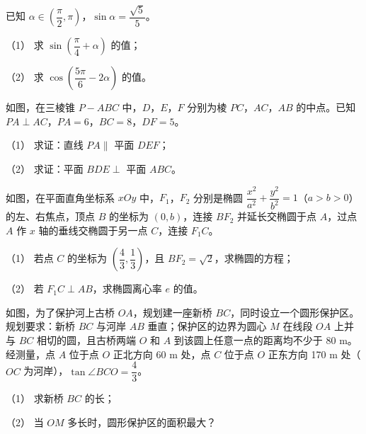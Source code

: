 \begin{question}
已知 $\alpha\in\left(\dfrac\pi2,\pi\right)$，$\sin\alpha=\dfrac{\sqrt5}{5}$。

（1） 求 $\sin\left(\dfrac\pi4+\alpha\right)$ 的值；

（2） 求 $\cos\left(\dfrac{5\pi}6-2\alpha\right)$ 的值。

\Needspace{0.4\textheight}
\end{question}
\begin{question}
如图，在三棱锥 $P-ABC$ 中，$D$，$E$，$F$ 分别为棱 $PC$，$AC$，$AB$ 的中点。已知 $PA\perp AC$，$PA=6$，$BC=8$，$DF=5$。

（1） 求证：直线 $PA\parallel$ 平面 $DEF$；

（2） 求证：平面 $BDE\perp$ 平面 $ABC$。
\nopagebreak[4]
\begin{center}\end{center}
\nopagebreak[4]
\Needspace{0.4\textheight}
\end{question}
\begin{question}
如图，在平面直角坐标系 $xOy$ 中，$F_1$，$F_2$ 分别是椭圆 $\dfrac{x^2}{a^2}+\dfrac{y^2}{b^2}=1$（$a>b>0$）的左、右焦点，顶点 $B$ 的坐标为 $(0,b)$，连接 $BF_2$ 并延长交椭圆于点 $A$，过点 $A$ 作 $x$ 轴的垂线交椭圆于另一点 $C$，连接 $F_1C$。

（1） 若点 $C$ 的坐标为 $\left(\dfrac43,\dfrac13\right)$，且 $BF_2=\sqrt2$，求椭圆的方程；

（2） 若 $F_1C\perp AB$，求椭圆离心率 $e$ 的值。
\nopagebreak[4]
\begin{center}\end{center}
\nopagebreak[4]
\Needspace{0.4\textheight}
\end{question}
\begin{question}
如图，为了保护河上古桥 $OA$，规划建一座新桥 $BC$，同时设立一个圆形保护区。规划要求：新桥 $BC$ 与河岸 $AB$ 垂直；保护区的边界为圆心 $M$ 在线段 $OA$ 上并与 $BC$ 相切的圆，且古桥两端 $O$ 和 $A$ 到该圆上任意一点的距离均不少于 80 m。经测量，点 $A$ 位于点 $O$ 正北方向 60 m 处，点 $C$ 位于点 $O$ 正东方向 170 m 处（$OC$ 为河岸），$\tan\angle BCO=\dfrac43$。

（1） 求新桥 $BC$ 的长；

（2） 当 $OM$ 多长时，圆形保护区的面积最大？
\nopagebreak[4]
\begin{center}\end{center}
\nopagebreak[4]
\end{question}
